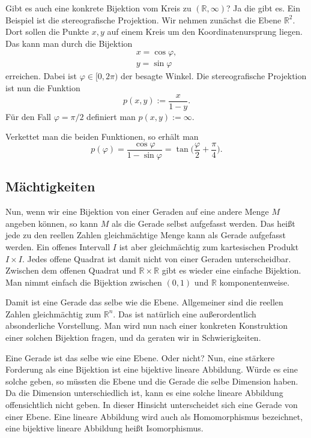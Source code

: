 \documentclass[a4paper,11pt,fleqn,twocolumn,twoside]{article}
\newcommand{\R}{\mathbb R}
\begin{document}
Gibt es auch eine konkrete Bijektion vom Kreis zu
$(\R,\infty)$? Ja die gibt es. Ein Beispiel ist die
stereografische Projektion. Wir nehmen zunächst die Ebene
$\R^2$. Dort sollen die Punkte $x,y$ auf einem Kreis
um den Koordinatenursprung liegen. Das kann man durch die Bijektion
\begin{gather}
x=\cos\varphi,\\
y=\sin\varphi
\end{gather}
erreichen. Dabei ist $\varphi\in{[0,2\pi)}$ der besagte Winkel.
Die stereografische Projektion ist nun die Funktion
\begin{equation}
p(x,y) := \frac{x}{1-y}.
\end{equation}
Für den Fall $\varphi=\pi/2$ definiert man $p(x,y):=\infty$.

Verkettet man die beiden Funktionen, so erhält man
\begin{equation}
p(\varphi) = \frac{\cos\varphi}{1-\sin\varphi}
= \tan\Big(\frac{\varphi}{2}+\frac{\pi}{4}\Big).
\end{equation}

\subsection{Mächtigkeiten}

Nun, wenn wir eine Bijektion von einer Geraden auf eine andere Menge
$M$ angeben können, so kann $M$ als die Gerade selbst aufgefasst
werden. Das heißt jede zu den reellen Zahlen gleichmächtige Menge
kann als Gerade aufgefasst werden. Ein offenes Intervall $I$ ist
aber gleichmächtig zum kartesischen Produkt $I\times I$. Jedes
offene Quadrat ist damit nicht von einer Geraden unterscheidbar.
Zwischen dem offenen Quadrat und $\R\times\R$ gibt
es wieder eine einfache Bijektion. Man nimmt einfach die Bijektion
zwischen $(0,1)$ und $\R$ komponentenweise.

Damit ist eine Gerade das selbe wie die Ebene. Allgemeiner sind die
reellen Zahlen gleichmächtig zum $\R^n$. Das ist natürlich
eine außerordentlich absonderliche Vorstellung. Man wird nun nach
einer konkreten Konstruktion einer solchen Bijektion fragen, und
da geraten wir in Schwierigkeiten.

Eine Gerade ist das selbe wie eine Ebene. Oder nicht?
Nun, eine stärkere Forderung als eine Bijektion ist eine
bijektive lineare Abbildung. Würde es eine solche geben, so müssten
die Ebene und die Gerade die selbe Dimension haben. Da die Dimension
unterschiedlich ist, kann es eine solche lineare Abbildung
offensichtlich nicht geben. In dieser Hinsicht unterscheidet sich
eine Gerade von einer Ebene. Eine lineare Abbildung wird auch als
Homomorphismus bezeichnet, eine bijektive lineare Abbildung heißt
Isomorphismus.
\end{document}

